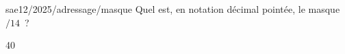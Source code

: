 \begin{question}{sae12/2025/adressage/masque}
  Quel est, en notation décimal pointée, le masque $/14$~?
  \begin{reponses}{4}{0}
  \end{reponses}
\end{question}

